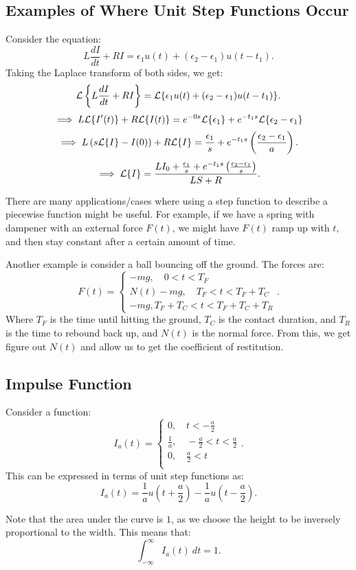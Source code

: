 \documentclass[../main/main.tex]{subfiles}
\begin{document}
\subsection{Examples of Where Unit Step Functions Occur}
\begin{example}
	Consider the equation: \[
		L \frac{dI}{dt}+RI= \epsilon_1u(t) + (\epsilon_2-\epsilon_1)u(t-t_1)
	.\] Taking the Laplace transform of both sides, we get: \[
	\mathcal{L} \left\{L\frac{dI}{dt}+RI\right\} = \mathcal{L} \{\epsilon_1u(t) + (\epsilon_2-\epsilon_1)u(t-t_1)\}  
	.\] \[
	\implies L \mathcal{L}\{I'(t)\} + R\mathcal{L} \{I(t)\} =e^{-0s}\mathcal{L} \{\epsilon_1\} + e^{-t_1s}\mathcal{L} \{\epsilon_2-\epsilon_1\}  
	\]\[
	\implies L\left( s\mathcal{L} \{I\} -I(0) \right) + R\mathcal{L} \{I\} = \frac{\epsilon_1}{s}+e^{-t_1s}\left( \frac{\epsilon_2-\epsilon_1}{a} \right) 
	.\]  \[
	\implies \mathcal{L} \{I\} = \frac{L I_0 + \frac{\epsilon_1}{s}+e^{-t_1s}\left( \frac{\epsilon_2-\epsilon_1}{s} \right) }{LS+R} 
	.\] 
\end{example}
There are many applications/cases where using a step function to describe a piecewise function might be useful. For example, if we have a spring with dampener with an external force $F(t)$, we might have $F(t)$ ramp up with $t$, and then stay constant after a certain amount of time.

Another example is consider a ball bouncing off the ground. The forces are: \[
	F(t) = \begin{cases}
		-mg,\quad 0<t<T_F\\
		N(t)-mg,\quad T_F < t < T_F+T_C \\ 
		-mg, T_F + T_C < t < T_F + T_C + T_R
	\end{cases} 
.\] Where $T_F$ is the time until hitting the ground, $T_C$ is the contact duration, and $T_R$ is the time to rebound back up, and $N(t)$ is the normal force. From this, we get figure out $N(t)$ and allow us to get the coefficient of restitution. 

\subsection{Impulse Function}
Consider a function: \[
	I_a(t) = \begin{cases}
		0,\quad t<-\frac{a}{2}\\
		\frac{1}{a},\quad -\frac{a}{2}<t<\frac{a}{2}\\
		0,\quad \frac{a}{2}<t\\
	\end{cases}
.\] This can be expressed in terms of unit step functions as: \[
I_a(t) = \frac{1}{a}u(t+\frac{a}{2}) - \frac{1}{a}u(t-\frac{a}{2})
.\] 
\begin{remark} 
Note that the area under the curve is $1$, as we choose the height to be inversely proportional to the width. This means that: \[
	\int^\infty_{-\infty}I_a(t)~dt = 1
.\]
\end{remark}
\end{document}
